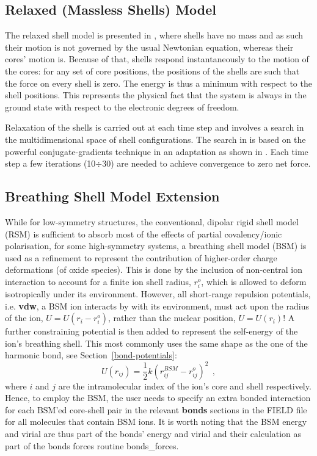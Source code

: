 \subsection{Relaxed (Massless Shells) Model}

The relaxed shell model is presented in \cite{lindan-93a}, where
shells have no mass and as such their motion is not governed
by the usual Newtonian equation, whereas their cores' motion is.
Because of that, shells respond instantaneously to the motion
of the cores: for any set of core positions, the positions of
the shells are such that the force on every shell is zero.  The
energy is thus a minimum with respect to the shell positions.
This represents the physical fact that the system is always in the
ground state with respect to the electronic degrees of freedom.

Relaxation of the shells is carried out at each time step and
involves a search in the multidimensional space of shell
configurations.  The search in \D is based on the powerful
conjugate-gradients technique \cite{shewchuk-94a} in an adaptation
as shown in \cite{lindan-93a}.  Each time step a few iterations
(10$\div$30) are needed to achieve convergence to zero net force.

\subsection{Breathing Shell Model Extension}

While for low-symmetry structures, the conventional, dipolar rigid
shell model (RSM) is sufficient to absorb most of the effects of
partial covalency/ionic polarisation, for some high-symmetry systems,
a breathing shell model (BSM) \cite{schroder-66a} is used as a refinement
to represent the contribution of higher-order charge deformations
(of oxide species).  This is done by the inclusion of non-central
ion interaction to account for a finite ion shell radius, $r_{i}^{o}$,
which is allowed to deform isotropically under its environment.
However, all short-range repulsion potentials, i.e. {\bf vdw}, a BSM ion
interacts by with its environment, must act upon the radius of the ion,
$U=U(r_{i}-r_{i}^{o})$, rather than the nuclear position, $U=U(r_{i})$!
A further constraining potential is then added to represent the self-energy
of the ion's breathing shell.  This most commonly uses the same shape as
the one of the harmonic bond, see Section~\ref{bond-potentials}:
\begin{equation}
U(r_{ij}) = \frac{1}{2} k (r_{ij}^{BSM}-r_{ij}^{o})^{2}~~,
\end{equation}
where $i$ and $j$ are the intramolecular index of the ion's core and
shell respectively.  Hence, to employ the BSM, the user needs to
specify an extra bonded interaction for each BSM'ed core-shell pair in
the relevant {\bf bonds} sections in the FIELD file for all molecules
that contain BSM ions.  It is worth noting that the BSM energy and virial
are thus part of the bonds' energy and virial and their calculation as
part of the bonds forces routine {\sc bonds\_forces}.

